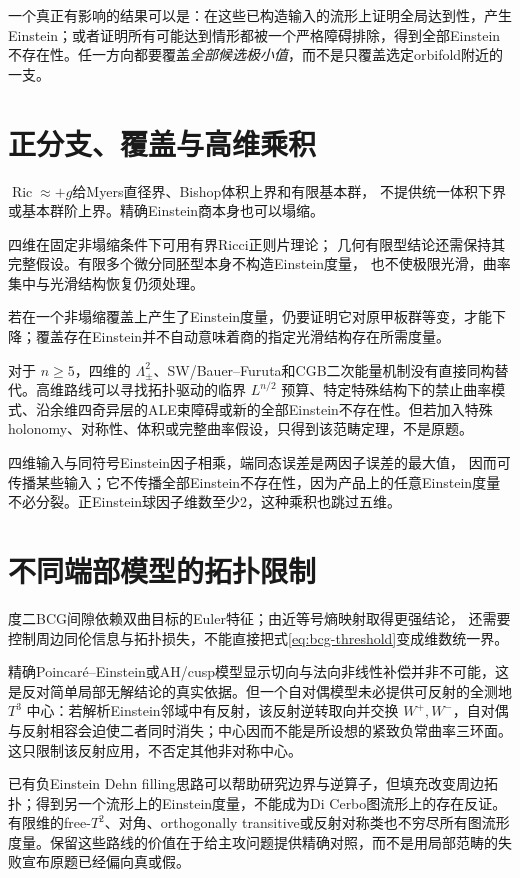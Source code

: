 \documentclass[UTF8,a4paper,11pt,fontset=fandol]{ctexart}
\numberwithin{equation}{section}
\theoremstyle{definition}
\newcommand{\Ric}{\operatorname{Ric}}
\begin{document}
一个真正有影响的结果可以是：在这些已构造输入的流形上证明全局达到性，产生Einstein；或者证明所有可能达到情形都被一个严格障碍排除，得到全部Einstein不存在性。任一方向都要覆盖\emph{全部候选极小值}，而不是只覆盖选定orbifold附近的一支。

\section{正分支、覆盖与高维乘积}
$\Ric\approx+g$给Myers直径界、Bishop体积上界和有限基本群，
不提供统一体积下界或基本群阶上界。精确Einstein商本身也可以塌缩。

四维在固定非塌缩条件下可用有界Ricci正则片理论\cite{CN}；
几何有限型结论还需保持其完整假设。有限多个微分同胚型本身不构造Einstein度量，
也不使极限光滑，曲率集中与光滑结构恢复仍须处理。

若在一个非塌缩覆盖上产生了Einstein度量，仍要证明它对原甲板群等变，才能下降；覆盖存在Einstein并不自动意味着商的指定光滑结构存在所需度量。

对于 $n\ge5$，四维的 $\Lambda^2_\pm$、SW/Bauer--Furuta和CGB二次能量机制没有直接同构替代。高维路线可以寻找拓扑驱动的临界 $L^{n/2}$ 预算、特定特殊结构下的禁止曲率模式、沿余维四奇异层的ALE束障碍或新的全部Einstein不存在性。但若加入特殊holonomy、对称性、体积或完整曲率假设，只得到该范畴定理，不是原题。

四维输入与同符号Einstein因子相乘，端同态误差是两因子误差的最大值，
因而可传播某些输入；它不传播全部Einstein不存在性，因为产品上的任意Einstein度量
不必分裂。正Einstein球因子维数至少2，这种乘积也跳过五维。


\section{不同端部模型的拓扑限制}
度二BCG间隙依赖双曲目标的Euler特征；由近等号熵映射取得更强结论，
还需要控制周边同伦信息与拓扑损失，不能直接把式\eqref{eq:bcg-threshold}变成维数统一界。

精确Poincar\'e--Einstein或AH/cusp模型显示切向与法向非线性补偿并非不可能，这是反对简单局部无解结论的真实依据。但一个自对偶模型未必提供可反射的全测地 $T^3$ 中心：若解析Einstein邻域中有反射，该反射逆转取向并交换 $W^+,W^-$，自对偶与反射相容会迫使二者同时消失；中心因而不能是所设想的紧致负常曲率三环面。这只限制该反射应用，不否定其他非对称中心。

已有负Einstein Dehn filling思路可以帮助研究边界与逆算子，但填充改变周边拓扑；得到另一个流形上的Einstein度量，不能成为Di Cerbo图流形上的存在反证。有限维的free-$T^2$、对角、orthogonally transitive或反射对称类也不穷尽所有图流形度量。保留这些路线的价值在于给主攻问题提供精确对照，而不是用局部范畴的失败宣布原题已经偏向真或假。
\end{document}
